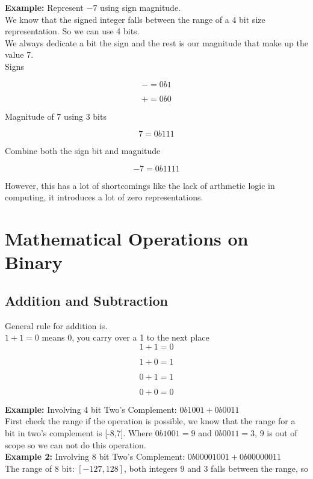 \documentclass{article}
\begin{document}
\noindent \textbf{Example:} Represent $-7$ using sign magnitude. \\

We know that the signed integer falls between the range of a 4 bit size representation. So we can use 4 bits. \\
We always dedicate a bit the sign and the rest is our magnitude that make up the value 7. \\

Signs

\[
- = 0b1
\]

\[
+ = 0b0
\]

Magnitude of 7 using 3 bits

\[
7 = 0b111 
\]

Combine both the sign bit and magnitude

\[
-7 = 0b1111
\]

\noindent However, this has a lot of shortcomings like the lack of arthmetic logic in computing, it introduces a lot of
zero representations.

\section{Mathematical Operations on Binary}
\subsection*{Addition and Subtraction}
\noindent General rule for addition is. \\

$1 + 1 = 0$ means 0, you carry over a 1 to the next place
\[
1 + 1 = 0 
\]

\[
1 + 0 = 1
\]

\[
0 + 1 = 1
\]

\[
0 + 0 = 0
\]

\noindent \textbf{Example:} Involving 4 bit Two's Complement: $0b1001 + 0b0011$ \\

First check the range if the operation is possible, we know that the range for a 
bit in two's complement is [-8,7].
Where $0b1001 = 9$ and $0b0011 = 3$, $9$ is out of scope so we can not do this
operation. \\

\noindent \textbf{Example 2:} Involving 8 bit Two's Complement: $0b0000 1001
+ 0b0000 0011$ \\

The range of 8 bit: $[-127,128]$, both integers $9$ and $3$ falls between the 
range, so
\end{document}
